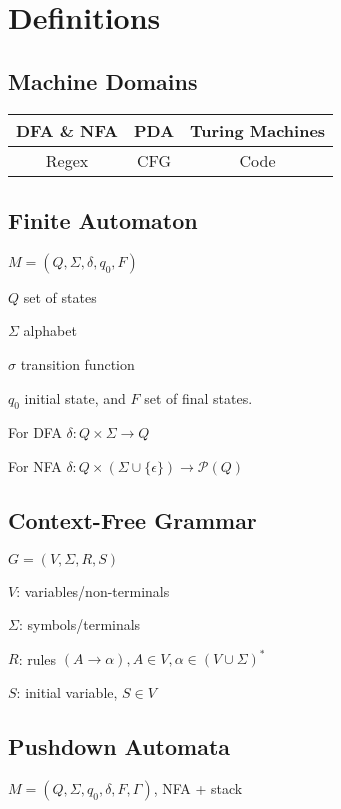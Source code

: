 \section{Definitions}
\subsection{Machine Domains}
\begin{tabular}{|c|c|c|}
  \hline
  DFA \& NFA & PDA & Turing Machines \\
  \hline
  Regex & CFG & Code \\
  \hline
\end{tabular}
\subsection{Finite Automaton}
$M = \left(Q, \Sigma, \delta, q_0, F\right)$

\hspace{5mm}$Q$ set of states

\hspace{5mm}$\Sigma$ alphabet

\hspace{5mm}$\sigma$ transition function

\hspace{5mm}$q_0$ initial state, and $F$ set of final states.

\hspace{5mm}For DFA $\delta: Q\times\Sigma \to Q$

\hspace{5mm}For NFA $\delta: Q\times(\Sigma \cup \{\epsilon\}) \to \mathcal{P}(Q)$
\subsection{Context-Free Grammar}
$G = (V, \Sigma, R, S)$

\hspace{5mm}$V$: variables/non-terminals

\hspace{5mm}$\Sigma$: symbols/terminals

\hspace{5mm}$R$: rules $(A \to \alpha), A\in V, \alpha\in(V\cup\Sigma)^*$

\hspace{5mm}$S$: initial variable, $S\in V$
\subsection{Pushdown Automata}
$M = (Q, \Sigma, q_0, \delta, F, \Gamma)$, NFA + stack

